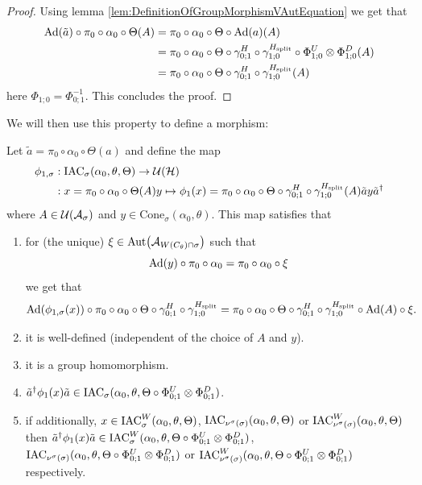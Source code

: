 \documentclass[11pt,a4paper,twoside]{article}
\numberwithin{equation}{section}
\begin{document}
	\begin{proof}
		Using lemma \ref{lem:DefinitionOfGroupMorphismVAutEquation} we get that
		\begin{align}
			\Ad{\tilde{a}}\circ\pi_0\circ\alpha_0\circ\Theta(A)&=\pi_0\circ\alpha_0\circ\Theta\circ\Ad{a}(A)\\
			&=\pi_0\circ\alpha_0\circ\Theta\circ\gamma^H_{0;1}\circ\gamma^{\Hsplit}_{1;0}\circ\Phi^U_{1;0}\otimes\Phi^D_{1;0}(A)\\
			&=\pi_0\circ\alpha_0\circ\Theta\circ\gamma^H_{0;1}\circ\gamma^{\Hsplit}_{1;0}(A)
		\end{align}
		here $\Phi_{1;0}=\Phi_{0;1}^{-1}$. This concludes the proof.
	\end{proof}
	We will then use this property to define a morphism:
	\begin{lemma}\label{lem:DefinitionOfGroupMorphism}
		Let $\tilde{a}=\pi_0\circ\alpha_0\circ\Theta(a)$ and define the map
		\begin{align}
			\phi_{1,\sigma}&:\textrm{IAC}_\sigma(\alpha_0,\theta,\Theta) \rightarrow \mathcal U(\mathcal H)\\
			\nonumber
			&:x=\pi_0\circ\alpha_0\circ\Theta(A)y\mapsto \phi_1(x)=\pi_0\circ\alpha_0\circ\Theta\circ\gamma^H_{0;1}\circ\gamma^{{H_{\text{split}}}}_{1;0}(A)\tilde{a}y\tilde{a}^\dagger
		\end{align}
		where $A\in\mathcal U(\mathcal A_\sigma)$ and $y\in\textrm{Cone}_\sigma(\alpha_0,\theta)$. This map satisfies that
		\begin{enumerate}
			\item  for (the unique) $\xi\in\Aut{\AA_{W(C_\theta)\cap\sigma}}$ such that
			\begin{equation}
				\Ad{y}\circ\pi_0\circ\alpha_0=\pi_0\circ\alpha_0\circ\xi
			\end{equation}
			we get that
			\begin{equation}\label{eq:ConditionDefinitionOfGroupMorphism}
				\Ad{\phi_{1,\sigma}(x)}\circ\pi_0\circ\alpha_0\circ\Theta\circ\gamma^H_{0;1}\circ\gamma^{\Hsplit}_{1;0}=\pi_0\circ\alpha_0\circ\Theta\circ\gamma^H_{0;1}\circ\gamma^{\Hsplit}_{1;0}\circ\Ad{A}\circ\xi.
			\end{equation}
			\item it is well-defined (independent of the choice of $A$ and $y$).
			\item it is a group homomorphism.
			\item $\tilde{a}^\dagger \phi_1(x)\tilde{a}\in\textrm{IAC}_\sigma(\alpha_0,\theta,\Theta\circ \Phi^U_{0;1}\otimes\Phi^D_{0;1})$.
			\item if additionally, $x\in \textrm{IAC}_\sigma^W(\alpha_0,\theta,\Theta)$, $\textrm{IAC}_{\nu^{\sigma}(\sigma)}(\alpha_0,\theta,\Theta)$ or $\textrm{IAC}_{\nu^{\sigma}(\sigma)}^W (\alpha_0,\theta,\Theta)$ then  $\tilde{a}^\dagger \phi_1(x)\tilde{a}\in\textrm{IAC}_\sigma^W(\alpha_0,\theta,\Theta\circ \Phi^U_{0;1}\otimes\Phi^D_{0;1})$, $\textrm{IAC}_{\nu^{\sigma}(\sigma)}(\alpha_0,\theta,\Theta\circ \Phi^U_{0;1}\otimes\Phi^D_{0;1})$ or $\textrm{IAC}_{\nu^{\sigma}(\sigma)}^W (\alpha_0,\theta,\Theta\circ \Phi^U_{0;1}\otimes\Phi^D_{0;1})$ respectively.
		\end{enumerate}
	\end{lemma}
\end{document}
